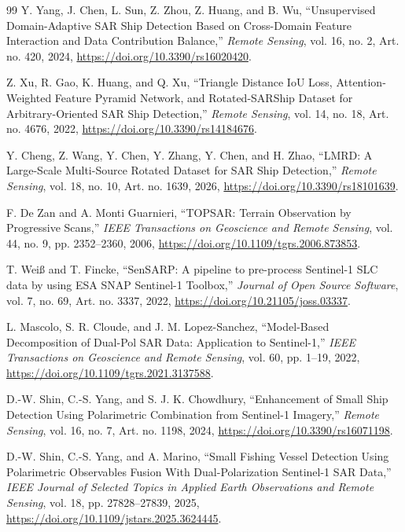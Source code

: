 \documentclass[conference]{IEEEtran}
\begin{document}
\begin{thebibliography}{99}
	 Y. Yang, J. Chen, L. Sun, Z. Zhou, Z. Huang, and B. Wu, ``Unsupervised Domain-Adaptive SAR Ship Detection Based on Cross-Domain Feature Interaction and Data Contribution Balance,'' \emph{Remote Sensing}, vol. 16, no. 2, Art. no. 420, 2024, \url{https://doi.org/10.3390/rs16020420}.

	 Z. Xu, R. Gao, K. Huang, and Q. Xu, ``Triangle Distance IoU Loss, Attention-Weighted Feature Pyramid Network, and Rotated-SARShip Dataset for Arbitrary-Oriented SAR Ship Detection,'' \emph{Remote Sensing}, vol. 14, no. 18, Art. no. 4676, 2022, \url{https://doi.org/10.3390/rs14184676}.

	 Y. Cheng, Z. Wang, Y. Chen, Y. Zhang, Y. Chen, and H. Zhao, ``LMRD: A Large-Scale Multi-Source Rotated Dataset for SAR Ship Detection,'' \emph{Remote Sensing}, vol. 18, no. 10, Art. no. 1639, 2026, \url{https://doi.org/10.3390/rs18101639}.

	 F. De Zan and A. Monti Guarnieri, ``TOPSAR: Terrain Observation by Progressive Scans,'' \emph{IEEE Transactions on Geoscience and Remote Sensing}, vol. 44, no. 9, pp. 2352--2360, 2006, \url{https://doi.org/10.1109/tgrs.2006.873853}.

	 T. Weiß and T. Fincke, ``SenSARP: A pipeline to pre-process Sentinel-1 SLC data by using ESA SNAP Sentinel-1 Toolbox,'' \emph{Journal of Open Source Software}, vol. 7, no. 69, Art. no. 3337, 2022, \url{https://doi.org/10.21105/joss.03337}.

	 L. Mascolo, S. R. Cloude, and J. M. Lopez-Sanchez, ``Model-Based Decomposition of Dual-Pol SAR Data: Application to Sentinel-1,'' \emph{IEEE Transactions on Geoscience and Remote Sensing}, vol. 60, pp. 1--19, 2022, \url{https://doi.org/10.1109/tgrs.2021.3137588}.

	 D.-W. Shin, C.-S. Yang, and S. J. K. Chowdhury, ``Enhancement of Small Ship Detection Using Polarimetric Combination from Sentinel-1 Imagery,'' \emph{Remote Sensing}, vol. 16, no. 7, Art. no. 1198, 2024, \url{https://doi.org/10.3390/rs16071198}.

	 D.-W. Shin, C.-S. Yang, and A. Marino, ``Small Fishing Vessel Detection Using Polarimetric Observables Fusion With Dual-Polarization Sentinel-1 SAR Data,'' \emph{IEEE Journal of Selected Topics in Applied Earth Observations and Remote Sensing}, vol. 18, pp. 27828--27839, 2025, \url{https://doi.org/10.1109/jstars.2025.3624445}.


\end{thebibliography}
\end{document}
